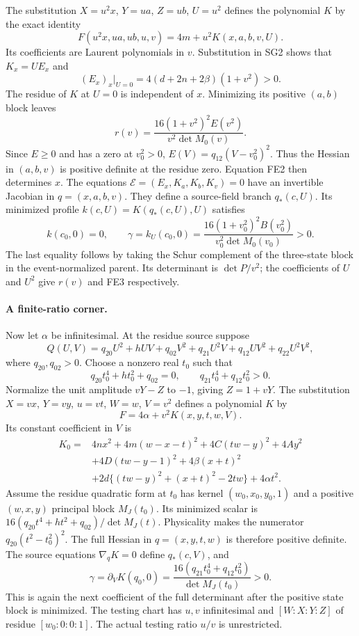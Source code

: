 The substitution $X=u^2x$, $Y=ua$, $Z=ub$, $U=u^2$ defines
the polynomial $K$ by the exact identity
\[
 F(u^2x,ua,ub,u,v)=4m+u^2K(x,a,b,v,U).
 \tag{FE1}
\]
Its coefficients are Laurent polynomials in $v$. Substitution in
SG2 shows that $K_x=UE_x$ and
\[
 (E_x)_x\big|_{U=0}=4(d+2n+2\beta)(1+v^2)>0.
 \tag{FE2}
\]
The residue of $K$ at $U=0$ is independent of $x$.
Minimizing its positive $(a,b)$ block leaves
\[
 r(v)=\frac{16(1+v^2)^2E(v^2)}{v^2\det M_0(v)}.
\]
Since $E\ge0$ and has a zero at $v_0^2>0$,
$E(V)=q_{12}(V-v_0^2)^2$. Thus the Hessian in $(a,b,v)$
is positive definite at the residue zero. Equation FE2 then
determines $x$. The equations
$\mathcal E=(E_x,K_a,K_b,K_v)=0$ have an invertible
Jacobian in $q=(x,a,b,v)$. They define a source-field branch
$q_*(c,U)$. Its minimized profile $k(c,U)=K(q_*(c,U),U)$ satisfies
\[
 k(c_0,0)=0,\qquad
 \gamma=k_U(c_0,0)=
 \frac{16(1+v_0^2)^2B(v_0^2)}{v_0^2\det M_0(v_0)}>0.
 \tag{FE3}
\]
The last equality follows by taking the Schur complement of the
three-state block in the event-normalized parent. Its determinant
is $\det P/v^2$; the coefficients of $U$ and $U^2$ give
$r(v)$ and FE3 respectively.

\paragraph{A finite-ratio corner.}
\label{component:p03b551f2a9a0}
\label{p03b551f2a9a0:a-positive-d-case-at-a-finite-ratio-distance-four-corner}
Now let $\alpha$ be infinitesimal. At the residue source suppose
\[
 Q(U,V)=q_{20}U^2+hUV+q_{02}V^2+
 q_{21}U^2V+q_{12}UV^2+q_{22}U^2V^2,
\]
where $q_{20},q_{02}>0$. Choose a nonzero real $t_0$ such that
\[
 q_{20}t_0^4+ht_0^2+q_{02}=0,
 \qquad q_{21}t_0^4+q_{12}t_0^2>0.
\]
Normalize the unit amplitude $vY-Z$ to $-1$, giving $Z=1+vY$.
The substitution $X=vx$, $Y=vy$, $u=vt$, $W=w$, $V=v^2$
defines a polynomial $K$ by
\[
 F=4\alpha+v^2K(x,y,t,w,V).
 \tag{FR1}
\]
Its constant coefficient in $V$ is
\[
\begin{split}
 K_0={}&4nx^2+4m(w-x-t)^2+4C(tw-y)^2+4Ay^2\\
 &+4D(tw-y-1)^2+4\beta(x+t)^2\\
 &+2d\{(tw-y)^2+(x+t)^2-2tw\}+4\alpha t^2.
\end{split}
\]
Assume the residue quadratic form at $t_0$ has kernel
$(w_0,x_0,y_0,1)$ and a positive $(w,x,y)$ principal block
$M_J(t_0)$. Its minimized scalar is
$16(q_{20}t^4+ht^2+q_{02})/\det M_J(t)$.
Physicality makes the numerator $q_{20}(t^2-t_0^2)^2$.
The full Hessian in $q=(x,y,t,w)$ is therefore positive definite.
The source equations $\nabla_qK=0$ define $q_*(c,V)$, and
\[
 \gamma=\partial_VK(q_0,0)=
 \frac{16(q_{21}t_0^4+q_{12}t_0^2)}{\det M_J(t_0)}>0.
 \tag{FR2}
\]
This is again the next coefficient of the full determinant after
the positive state block is minimized. The testing chart has
$u,v$ infinitesimal and $[W:X:Y:Z]$ of residue $[w_0:0:0:1]$.
The actual testing ratio $u/v$ is unrestricted.

